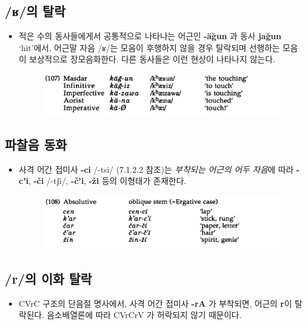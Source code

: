 \subsection{/ʁ/의 탈락}
\begin{itemize}
\item 적은 수의 동사들에게서 공통적으로 나타나는 어근인 \textbf{-äğun} 과 동사 \textbf{jağun} `hit'에서, 어근말 자음 /ʁ/는 모음이 후행하지 않을 경우 탈락되며 선행하는 모음이 보상적으로 장모음화한다. 다른 동사들은 이런 현상이 나타나지 않는다.
\begin{figure}[H]
\centerline{\includegraphics[width=.8\linewidth]{Lezgian/src/ex107.png}}
\end{figure}
\end{itemize}

\subsection{파찰음 동화}
\begin{itemize}
\item 사격 어간 접미사 \textbf{-ci} /-tsi/ (7.1.2.2 참조)는 \emph{부착되는 어근의 어두 자음}에 따라 \textbf{-cʼi}, \textbf{-či} /-tʃi/, \textbf{-čʼi}, \textbf{-ži} 등의 이형태가 존재한다.
\begin{figure}[H]
\centerline{\includegraphics[width=.8\linewidth]{Lezgian/src/ex108.png}}
\end{figure}
\end{itemize}

\subsection{/r/의 이화 탈락}
\begin{itemize}
\item CVrC 구조의 단음절 명사에서, 사격 어간 접미사 \textbf{-rA} 가 부착되면, 어근의 \textbf{r}이 탈락된다. 음소배열론에 따라 CVrCrV 가 허락되지 않기 때문이다. 
\end{itemize}

